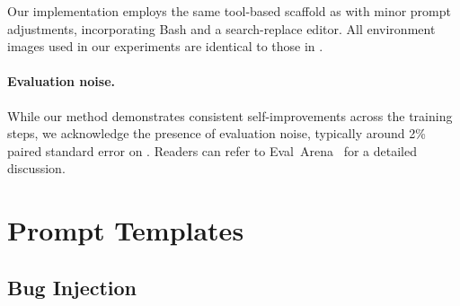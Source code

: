 Our implementation employs the same tool-based scaffold as \cwm with minor prompt adjustments, incorporating Bash and a search-replace editor. All environment images used in our experiments are identical to those in \cwm.

\paragraph{Evaluation noise.}
While our method demonstrates consistent self-improvements across the training steps, we acknowledge the presence of evaluation noise, typically around 2\% paired standard error on \sbv. Readers can refer to Eval~Arena~\cite{evalarena} for a detailed discussion.



\section{Prompt Templates}
\subsection{Bug Injection}
\label{sec:apd:prompt_bug_injection}

